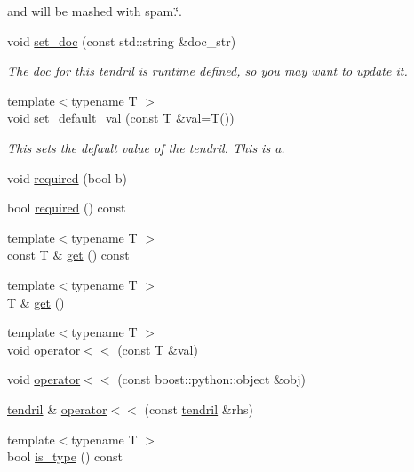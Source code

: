 \begin{DoxyCompactItemize}
\begin{DoxyCompactList}
 and will be mashed with spam.\char`\"{}. \end{DoxyCompactList}\item 
void \hyperlink{classecto_1_1tendril_ad56ae7364e7f7464eba444aebc50adc8}{set\-\_\-doc} (const std\-::string \&doc\-\_\-str)
\begin{DoxyCompactList}\small\item\em \-The doc for this tendril is runtime defined, so you may want to update it. \end{DoxyCompactList}\item 
{\footnotesize template$<$typename T $>$ }\\void \hyperlink{classecto_1_1tendril_a9186713043e34915df9488fb135110b3}{set\-\_\-default\-\_\-val} (const \-T \&val=\-T())
\begin{DoxyCompactList}\small\item\em \-This sets the default value of the tendril. \-This is a. \end{DoxyCompactList}\item 
void \hyperlink{classecto_1_1tendril_a216eb6b817644e1dfd76d3ba07d0ced7}{required} (bool b)
\item 
bool \hyperlink{classecto_1_1tendril_aa10be79605183977989cf01956aedeb6}{required} () const 
\item 
{\footnotesize template$<$typename T $>$ }\\const \-T \& \hyperlink{classecto_1_1tendril_aeeacd721a1d85f6c71c6d238b47c17f6}{get} () const 
\item 
{\footnotesize template$<$typename T $>$ }\\\-T \& \hyperlink{classecto_1_1tendril_a25420b71b89431659b310730ca6c55f0}{get} ()
\item 
{\footnotesize template$<$typename T $>$ }\\void \hyperlink{classecto_1_1tendril_ab02075b0d910360104974c1771edcc7f}{operator$<$$<$} (const \-T \&val)
\item 
void \hyperlink{classecto_1_1tendril_af9df4c4225712b440c9340d8969e337e}{operator$<$$<$} (const boost\-::python\-::object \&obj)
\item 
\hyperlink{classecto_1_1tendril}{tendril} \& \hyperlink{classecto_1_1tendril_adbf8a7e6ac9bc41d9a17f2f362e8d3f6}{operator$<$$<$} (const \hyperlink{classecto_1_1tendril}{tendril} \&rhs)
\item 
{\footnotesize template$<$typename T $>$ }\\bool \hyperlink{classecto_1_1tendril_adec0a36989492e2bd9ae9f03f954b9af}{is\-\_\-type} () const 

\end{DoxyCompactItemize}
